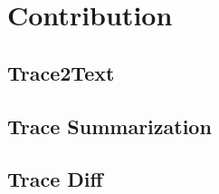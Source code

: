 \section{Contribution}
\label{sec:contribution}

\subsection{Trace2Text}

\subsection{Trace Summarization}

\subsection{Trace Diff}